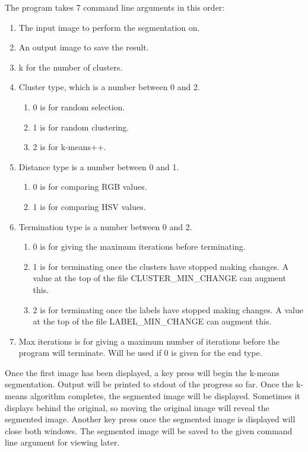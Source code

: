 \documentclass{article}
\begin{document}
The program takes 7 command line arguments in this order:
\begin{enumerate}
\item The input image to perform the segmentation on.
\item An output image to save the result.
\item k for the number of clusters.
\item Cluster type, which is a number between 0 and 2.
  \begin{enumerate}
  \item 0 is for random selection.
  \item 1 is for random clustering.
  \item 2 is for k-means++.
  \end{enumerate}
\item Distance type is a number between 0 and 1.
  \begin{enumerate}
  \item 0 is for comparing RGB values.
  \item 1 is for comparing HSV values.
  \end{enumerate}
\item Termination type is a number between 0 and 2.
  \begin{enumerate}
  \item 0 is for giving the maximum iterations before terminating.
  \item 1 is for terminating once the clusters have stopped making changes. A
    value at the top of the file CLUSTER\_MIN\_CHANGE can augment this.
  \item 2 is for terminating once the labels have stopped making changes. A value
    at the top of the file LABEL\_MIN\_CHANGE can augment this.
  \end{enumerate}
\item Max iterations is for giving a maximum number of iterations before the
  program will terminate. Will be used if 0 is given for the end type.
\end{enumerate}

Once the first image has been displayed, a key press will begin the k-means
segmentation. Output will be printed to stdout of the progress so far. Once the
k-means algorithm completes, the segmented image will be displayed. Sometimes it
displays behind the original, so moving the original image will reveal the
segmented image. Another key press once the segmented image is displayed will
close both windows. The segmented image will be saved to the given command line
argument for viewing later.
\end{document}
